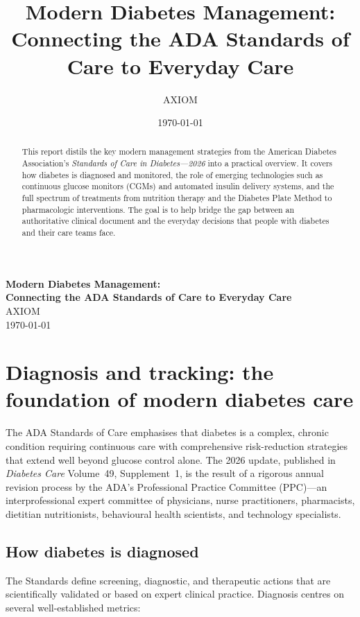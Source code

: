 \documentclass[11pt,a4paper]{article}
\title{Modern Diabetes Management: Connecting the ADA Standards of Care to Everyday Care}
\author{AXIOM}
\date{\today}
\begin{document}
\thispagestyle{firstpage}

\begin{center}
  \vspace*{2.5cm}
  {\LARGE \textbf{Modern Diabetes Management:}} \\[0.3em]
  {\LARGE \textbf{Connecting the ADA Standards of Care to Everyday Care}} \\[0.8em]
  {\large AXIOM} \\[0.5em]
  {\large \today}
\end{center}

\begin{abstract}
This report distils the key modern management strategies from the American
Diabetes Association's \emph{Standards of Care in Diabetes---2026} into a
practical overview. It covers how diabetes is diagnosed and monitored, the
role of emerging technologies such as continuous glucose monitors (CGMs) and
automated insulin delivery systems, and the full spectrum of treatments from
nutrition therapy and the Diabetes Plate Method to pharmacologic interventions.
The goal is to help bridge the gap between an authoritative clinical document
and the everyday decisions that people with diabetes and their care teams face.
\end{abstract}

\newpage

\section{Diagnosis and tracking: the foundation of modern diabetes care}

The ADA Standards of Care emphasises that diabetes is a complex, chronic
condition requiring continuous care with comprehensive risk-reduction
strategies that extend well beyond glucose control alone. The 2026 update,
published in \emph{Diabetes Care} Volume~49, Supplement~1, is the result of a
rigorous annual revision process by the ADA's Professional Practice Committee
(PPC)---an interprofessional expert committee of physicians, nurse practitioners,
pharmacists, dietitian nutritionists, behavioural health scientists, and
technology specialists.

\subsection{How diabetes is diagnosed}

The Standards define screening, diagnostic, and therapeutic actions that are
scientifically validated or based on expert clinical practice. Diagnosis
centres on several well-established metrics:
\end{document}

